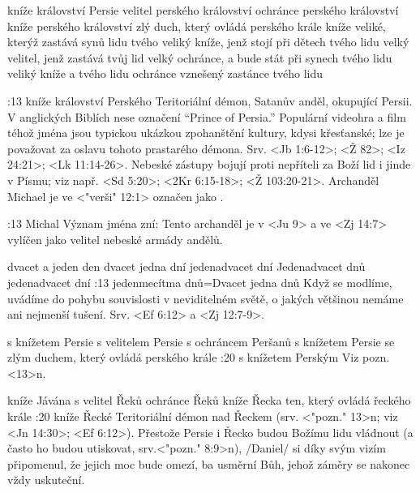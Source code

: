     {kníže království Persie}   %
    {velitel perského království}   %
    {ochránce perského království}   %
    {kníže perského království}   %
    {zlý duch, který ovládá perského krále}   %
\vdef   
    {kníže veliké, kterýž zastává synů lidu tvého}   %
    {veliký kníže, jenž stojí při dětech tvého lidu}   %
    {velký velitel, jenž zastává tvůj lid}   %
    {velký ochránce, a bude stát při synech tvého lidu}   %
    {veliký kníže a tvého lidu ochránce}   %
    {vznešený zastánce tvého lidu}   %
    
:13 {kníže království Perského} Teritoriální démon, Satanův anděl, okupující Persii. V anglických Biblích nese označení ``Prince of Persia.'' Populární videohra a film téhož jména jsou typickou ukázkou zpohanštění kultury, kdysi křesťanské; lze je považovat za oslavu tohoto prastarého démona.
Srv. <Jb 1:6-12>; <Ž 82>; <Iz 24:21>; <Lk 11:14-26>. Nebeské zástupy bojují proti nepříteli za Boží lid  i jinde v Písmu; viz např. <Sd 5:20>;  <2Kr 6:15-18>;  <Ž 103:20-21>. Archanděl Michael je ve  <"verši" 12:1> označen jako  .


:13 {Michal} Význam jména zní:  Tento archanděl je v <Ju 9> a ve <Zj 14:7>   vylíčen jako velitel nebeské armády andělů. 

    {dvacet a jeden den} %
    {dvacet jedna dní}   %
    {jedenadvacet dní}   %
    {Jedenadvacet dnů}   %
    {jedenadvacet dní}   %
:13 {jedenmecítma dnů}={Dvacet jedna dnů} Když se modlíme, uvádíme do pohybu souvislosti v neviditelném světě, o jakých většinou nemáme ani nejmenší tušení. Srv. <Ef 6:12> a <Zj 12:7-9>.

    {s knížetem Persie}   %
    {s velitelem Persie}   %
    {s ochráncem Peršanů}   %
    {s knížetem Persie}   %
    {se zlým duchem, který ovládá perského krále}   %
:20 {s knížetem Perským} Viz pozn. <13>n.

    {kníže Jávána}   %
    {s velitel Řeků}   %
    {ochránce Řeků}   %
    {kníže Řecka}   %
    {ten, který ovládá řeckého krále}   %
:20 {kníže Řecké} Teritoriální démon nad Řeckem (srv. <"pozn." 13>n; viz <Jn 14:30>; <Ef 6:12>). Přestože Persie i Řecko budou Božímu lidu vládnout (a často ho budou utiskovat, srv.<"pozn." 8:9>n),  \x/Daniel/ si díky svým vizím připomenul, že jejich moc bude omezí, ba usměrní Bůh, jehož záměry se nakonec vždy uskuteční.


